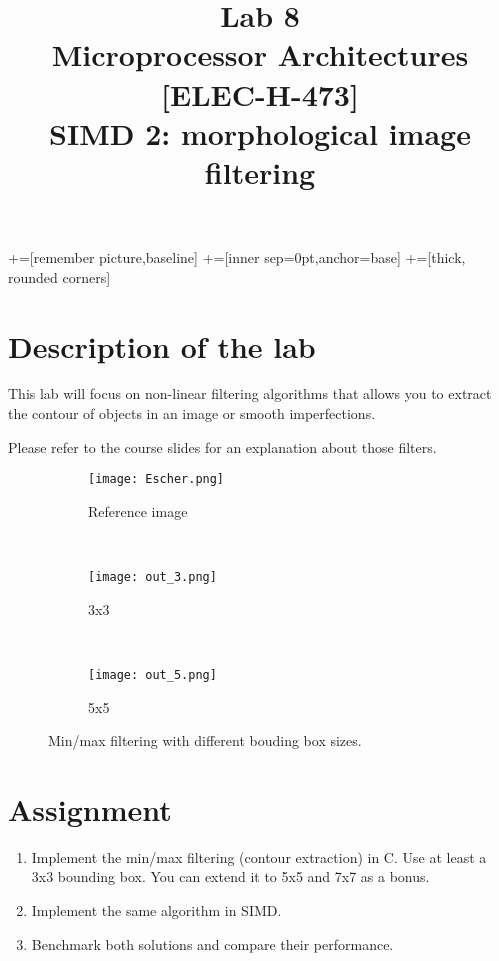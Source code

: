 \documentclass[10pt,a4paper]{article}
\date{\vspace{-1cm}\version}
\title{\vspace{-2cm} Lab 8\\ Microprocessor Architectures [ELEC-H-473]\\ SIMD 2: morphological image filtering \ifthenelse{\boolean{corrige}}{~\\Corrigé}{}}
\theoremstyle{definition}%
\begin{document}
\newcommand\tabnode[1]{\addtocounter{nodecount}{1} \tikz \node (\arabic{nodecount}) {#1};}

+=[remember picture,baseline]
+=[inner sep=0pt,anchor=base]
+=[thick, rounded corners]



\maketitle
\section*{Description of the lab}
This lab will focus on non-linear filtering algorithms that allows you to extract the contour of objects in an image or smooth imperfections.


Please refer to the course slides for an explanation about those filters.

\begin{figure*}[h]
    \centering
    \begin{subfigure}[t]{0.3\textwidth}
        \centering
        \texttt{[image: Escher.png]}
        \caption{Reference image}
    \end{subfigure}%
    ~ 
    \begin{subfigure}[t]{0.3\textwidth}
        \centering
        \texttt{[image: out\_3.png]}
        \caption{3x3}
    \end{subfigure}%
    ~ 
    \begin{subfigure}[t]{0.3\textwidth}
        \centering
        \texttt{[image: out\_5.png]}
        \caption{5x5}
    \end{subfigure}
    \caption{Min/max filtering with different bouding box sizes.}
\end{figure*}

\section*{Assignment}
\begin{enumerate}
	\item Implement the min/max filtering (contour extraction) in C.
	Use at least a 3x3 bounding box. You can extend it to 5x5 and 7x7 as a bonus.
	\item Implement the same algorithm in SIMD.
	\item Benchmark both solutions and compare their performance.
\end{enumerate}
\end{document}
